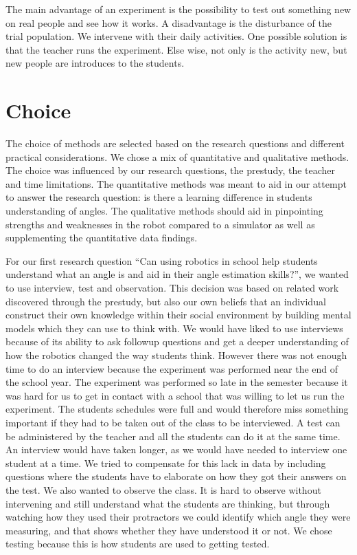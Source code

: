 \bigskip\noindent
The main advantage of an experiment is the possibility  to test out something new on real people and see how it works.
A disadvantage is the disturbance of the trial population. We intervene with their daily activities. One possible solution is that the teacher runs the experiment. Else wise, not only is the activity new, but new people are introduces to the students.

\section{Choice}
The choice of methods are selected based on the research questions and different practical considerations. We chose a mix of quantitative and qualitative methods. The choice was influenced by our research questions, the prestudy, the teacher and time limitations. The quantitative methods was meant to aid in our attempt to answer the research question: is there a learning difference in students understanding of angles. The qualitative methods should aid in pinpointing strengths and weaknesses in the robot compared to a simulator as well as supplementing the quantitative data findings. 

\bigskip\noindent
For our first research question ``Can using robotics in school help students understand what an angle is and aid in their angle estimation skills?'', we wanted to use interview, test and observation. This decision was based on related work discovered through the prestudy, but also our own beliefs that an individual construct their own knowledge within their social environment by building mental models which they can use to think with. We would have liked to use interviews because of its ability to ask followup questions and get a deeper understanding of how the robotics changed the way students think. However there was not enough time to do an interview because the experiment was performed near the end of the school year. The experiment was performed so late in the semester because it was hard for us to get in contact with a school that was willing to let us run the experiment. The students schedules were full and would therefore miss something important if they had to be taken out of the class to be interviewed. A test can be administered by the teacher and all the students can do it at the same time. An interview would have taken longer, as we would have needed to interview one student at a time. We tried to compensate for this lack in data by including questions where the students have to elaborate on how they got their answers on the test. We also wanted to observe the class. It is hard to observe without intervening and still understand what the students are thinking, but through watching how they used their protractors we could identify which angle they were measuring, and that shows whether they have understood it or not. We chose testing because this is how students are used to getting tested.

